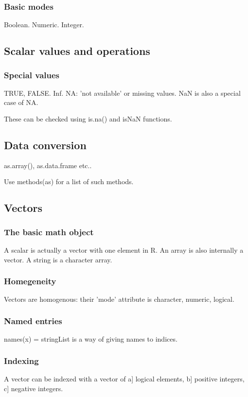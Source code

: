 \documentclass[oneside, article]{memoir}
\begin{document}
\subsubsection{Basic modes}
Boolean. Numeric. Integer.

\subsection{Scalar values and operations}
\subsubsection{Special values}
TRUE, FALSE. Inf. NA: 'not available' or missing values. NaN is also a special case of NA.

These can be checked using is.na() and isNaN functions.

\subsection{Data conversion}
as.array(), as.data.frame etc..

Use methods(as) for a list of such methods.

\subsection{Vectors}
\subsubsection{The basic math object}
A scalar is actually a vector with one element in R. An array is also internally a vector. A string is a character array.

\subsubsection{Homegeneity}
Vectors are homogenous: their 'mode' attribute is character, numeric, logical.

\subsubsection{Named entries}
names(x) = stringList is a way of giving names to indices.

\subsubsection{Indexing}
A vector can be indexed with a vector of a] logical elements, b] positive integers, c] negative integers.
\end{document}
